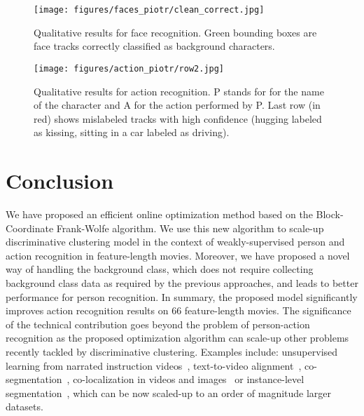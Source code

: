 \documentclass[10pt,twocolumn,letterpaper]{article}
\begin{document}
\begin{figure*}[t]
  \centering
  \texttt{[image: figures/faces\_piotr/clean\_correct.jpg]}
  \caption{
    Qualitative results for face recognition. 
    Green bounding boxes are face tracks correctly classified as background characters.
  }
  \label{fig:qualitative-faces}
  \vspace{-.2cm}
\end{figure*}
\vspace{-.5cm}
\begin{figure*}[t]
  \centering
  \texttt{[image: figures/action\_piotr/row2.jpg]}
  \caption{
    Qualitative results for action recognition. P stands for for the name of the character and A for the action performed by P.
    Last row (in red) shows mislabeled tracks with high confidence 
    (\eg hugging labeled as kissing, sitting in a car labeled as driving).
  }
  \label{fig:qualitative-action}
  \vspace{-.3cm}
\end{figure*} \vspace{-0.8cm}
\section{Conclusion}
\vspace{-.3cm}
We have proposed an efficient online optimization method based on the Block-Coordinate Frank-Wolfe algorithm.
We use this new algorithm to scale-up discriminative clustering model in the context of weakly-supervised person and action recognition in feature-length movies.
Moreover, we have proposed a novel way of handling the background class, which does not require collecting background class data as required by the previous approaches, and leads to better performance for person recognition.
In summary, the proposed model significantly improves action recognition results on 66 feature-length movies.
The significance of the technical contribution goes beyond the problem of person-action recognition as the proposed optimization algorithm can scale-up other problems recently tackled by discriminative clustering.
Examples include: unsupervised learning from narrated instruction videos~\cite{alayrac16unsupervised}, text-to-video alignment~\cite{bojanowski15weakly}, co-segmentation~\cite{joulin10discriminative}, co-localization in videos and images~\cite{tang14efficient} or instance-level segmentation~\cite{seguin16instance}, which can be now scaled-up to an order of magnitude larger datasets.
\vspace{-.3cm}
\end{document}

